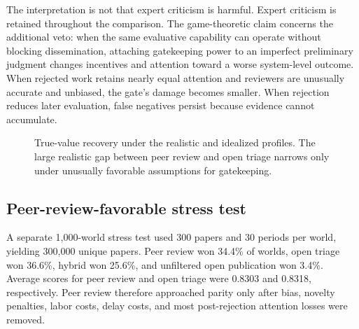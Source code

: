 The interpretation is not that expert criticism is harmful. Expert criticism is retained throughout the comparison. The game-theoretic claim concerns the additional veto: when the same evaluative capability can operate without blocking dissemination, attaching gatekeeping power to an imperfect preliminary judgment changes incentives and attention toward a worse system-level outcome. When rejected work retains nearly equal attention and reviewers are unusually accurate and unbiased, the gate's damage becomes smaller. When rejection reduces later evaluation, false negatives persist because evidence cannot accumulate.


\begin{figure}[ht]
\centering
{}
\caption{True-value recovery under the realistic and idealized profiles. The large realistic gap between peer review and open triage narrows only under unusually favorable assumptions for gatekeeping.}
\label{fig:profiles_truevalue}
\end{figure}

\subsection{Peer-review-favorable stress test}

A separate 1,000-world stress test used 300 papers and 30 periods per world, yielding 300,000 unique papers. Peer review won 34.4\% of worlds, open triage won 36.6\%, hybrid won 25.6\%, and unfiltered open publication won 3.4\%. Average scores for peer review and open triage were 0.8303 and 0.8318, respectively. Peer review therefore approached parity only after bias, novelty penalties, labor costs, delay costs, and most post-rejection attention losses were removed.


